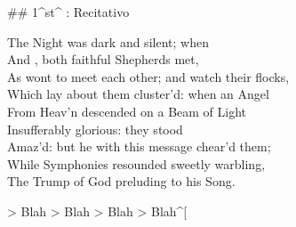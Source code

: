 ## 1^st^ \mvmt: Recitativo

\begin{linenumbers}
The Night was dark and silent; when  \\
And , both faithful Shepherds met,  \\
As wont to meet each other; and watch their flocks,  \\
Which lay about them cluster’d: when an Angel  \\
From Heav’n descended on a Beam of Light  \\
Insufferably glorious: they stood  \\
Amaz’d: but he with this message chear’d them;  \\
While Symphonies resounded sweetly warbling,  \\
The Trump of God preluding to his Song.
\end{linenumbers}

> Blah
> Blah
> Blah
> Blah^[
